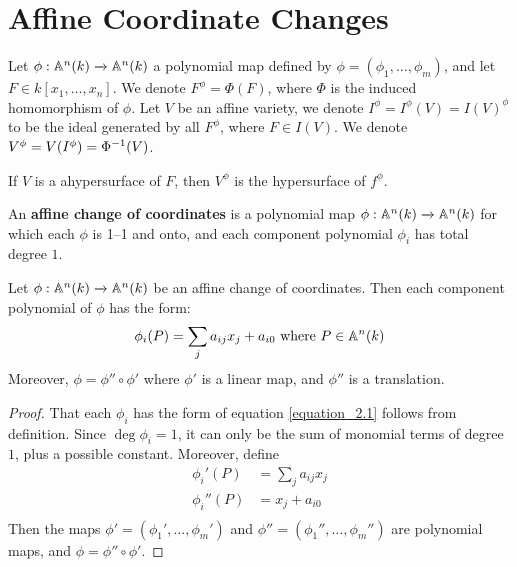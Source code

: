 \section{Affine Coordinate Changes}

Let $\phi:\mathbb{A}^n(k) \xrightarrow{} \mathbb{A}^n(k)$ a polynomial map defined by
$\phi=(\phi_1, \dots, \phi_m)$, and let $F \in k[x_1, \dots, x_n]$. We denote
$F^\phi=\Phi(F)$, where $\Phi$ is the induced homomorphism of $\phi$. Let $V$ be
an affine variety, we denote $I^\phi=I^\phi(V)=I(V)^\phi$ to be the ideal
generated by all $F^\phi$, where  $F \in I(V)$. We denote
$V^\phi=V(I^\phi)=\Phi^{-1}(V)$.

\begin{example}\label{example_2.1}
  If $V$ is a ahypersurface of  $F$, then  $V^\phi$ is the hypersurface of
  $f^\phi$.
\end{example}

\begin{definition}
  An \textbf{affine change of coordinates} is a polynomial map
  $\phi:\mathbb{A}^n(k) \xrightarrow{} \mathbb{A}^n(k)$ for which each $\phi$ is 1--1 and onto,
  and each component polynomial $\phi_i$ has total degree $1$.
\end{definition}

\begin{lemma}\label{lemma_2.2.1}
  Let $\phi:\mathbb{A}^n(k) \xrightarrow{} \mathbb{A}^n(k)$ be an affine change of coordinates.
  Then each component polynomial of $\phi$ has the form:
  \begin{equation}\label{equation_2.1}
    \phi_i(P)=\sum_{j}{a_{ij}x_j}+a_{i0} \text{ where } P \in \mathbb{A}^n(k)
  \end{equation}
  Moreover, $\phi=\phi'' \circ \phi'$ where $\phi'$ is a linear map, and
  $\phi''$ is a translation.
\end{lemma}
\begin{proof}
  That each $\phi_i$ has the form of equation \ref{equation_2.1} follows from
  definition. Since $\deg{\phi_i}=1$, it can only be the sum of monomial terms
  of degree $1$, plus a possible constant. Moreover, define
  \begin{align*}
    \phi_i'(P)  &=  \sum_{j}{a_{ij}x_j} \\
    \phi_i''(P) &=  x_j+a_{i0} \\
  \end{align*}
  Then the maps $\phi'=(\phi_1', \dots, \phi_m')$ and $\phi''=(\phi_1'', \dots,
  \phi_m'')$ are polynomial maps, and $\phi=\phi'' \circ \phi'$.
\end{proof}

